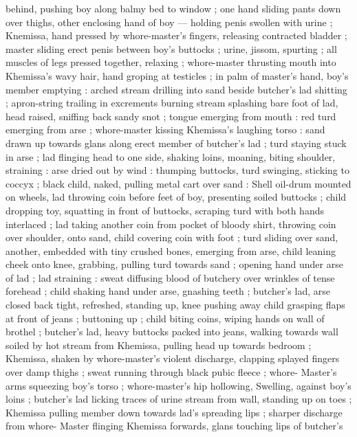 behind, pushing boy along balmy bed to window ; one hand sliding 
pants down over thighs, other enclosing hand of boy --- holding 
penis swollen with urine ; Knemissa, hand pressed by whore-master's 
fingers, releasing contracted bladder ; master sliding erect penis 
between boy's buttocks ; urine, jissom, spurting ; all muscles of legs 
pressed together, relaxing ; whore-master thrusting mouth into 
Khemissa's wavy hair, hand groping at testicles ; in palm of master's 
hand, boy's member emptying : arched stream drilling into sand 
beside butcher's lad shitting ; apron-string trailing in excrements 
burning stream splashing bare foot of lad, head raised, sniffing back 
sandy snot ; tongue emerging from mouth : red turd emerging from 
arse ; whore-master kissing Khemissa's laughing torso : sand drawn 
up towards glans along erect member of butcher's lad ; turd staying 
stuck in arse ; lad flinging head to one side, shaking loins, moaning, 
biting shoulder, straining : arse dried out by wind : thumping 
buttocks, turd swinging, sticking to coccyx ; black child, naked, 
pulling metal cart over sand : Shell oil-drum mounted on wheels, lad 
throwing coin before feet of boy, presenting soiled buttocks ; child 
dropping toy, squatting in front of buttocks, scraping turd with both 
hands interlaced ; lad taking another coin from pocket of bloody 
shirt, throwing coin over shoulder, onto sand, child covering coin with 
foot ; turd sliding over sand, another, embedded with tiny crushed 
bones, emerging from arse, child leaning cheek onto knee, grabbing, 
pulling turd towards sand ; opening hand under arse of lad ; lad 
straining : sweat diffusing blood of butchery over wrinkles of tense 
forehead ; child shaking hand under arse, gnashing teeth ; butcher's 
lad, arse closed back tight, refreshed, standing up, knee pushing 
away child grasping flaps at front of jeans ; buttoning up ; child 
biting coins, wiping hands on wall of brothel ; butcher's lad, heavy 
buttocks packed into jeans, walking towards wall soiled by hot stream 
from Khemissa, pulling head up towards bedroom ; Khemissa, shaken 
by whore-master's violent discharge, clapping splayed fingers over 
damp thighs ; sweat running through black pubic fleece ; whore- 
Master's arms squeezing boy's torso ; whore-master's hip hollowing, 
Swelling, against boy's loins ; butcher's lad licking traces of urine 
stream from wall, standing up on toes ; Khemissa pulling member 
down towards lad's spreading lips ; sharper discharge from whore- 
Master flinging Khemissa forwards, glans touching lips of butcher's 
